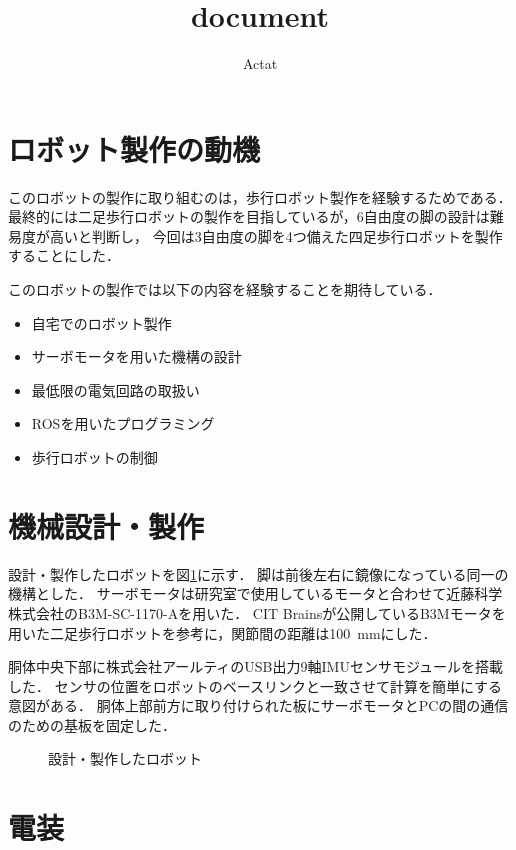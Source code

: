 \documentclass[a4paper]{jlreq}
\begin{document}
  \title{document}
  \author{Actat}
  \date{}
  \maketitle

  \section{ロボット製作の動機}

  このロボットの製作に取り組むのは，歩行ロボット製作を経験するためである．
  最終的には二足歩行ロボットの製作を目指しているが，6自由度の脚の設計は難易度が高いと判断し，
  今回は3自由度の脚を4つ備えた四足歩行ロボットを製作することにした．

  このロボットの製作では以下の内容を経験することを期待している．
  \begin{itemize}
    \item 自宅でのロボット製作
    \item サーボモータを用いた機構の設計
    \item 最低限の電気回路の取扱い
    \item ROSを用いたプログラミング
    \item 歩行ロボットの制御
  \end{itemize}

  \section{機械設計・製作}

  設計・製作したロボットを図\ref{fig:robot}に示す．
  脚は前後左右に鏡像になっている同一の機構とした．
  サーボモータは研究室で使用しているモータと合わせて近藤科学株式会社のB3M-SC-1170-Aを用いた．
  CIT Brainsが公開しているB3Mモータを用いた二足歩行ロボットを参考に，関節間の距離は\SI{100}{mm}にした．

  胴体中央下部に株式会社アールティのUSB出力9軸IMUセンサモジュールを搭載した．
  センサの位置をロボットのベースリンクと一致させて計算を簡単にする意図がある．
  胴体上部前方に取り付けられた板にサーボモータとPCの間の通信のための基板を固定した．

  \begin{figure}[htb]
    \centering
    
    \caption{
      設計・製作したロボット
    }
    \label{fig:robot}
  \end{figure}

  \section{電装}
\end{document}
